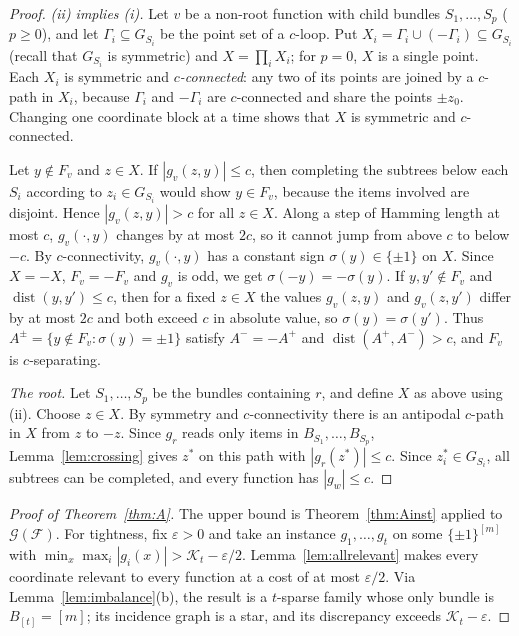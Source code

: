 \documentclass[11pt,letterpaper]{article}
\theoremstyle{definition}
\newcommand{\cF}{\mathcal{F}}
\newcommand{\cG}{\mathcal{G}}
\newcommand{\cube}[1]{\{\pm1\}^{#1}}
\DeclareMathOperator{\dist}{dist}
\begin{document}
\begin{proof}
\smallskip\noindent\emph{(ii) implies (i).}
Let $v$ be a non-root function with child bundles $S_1,\dots,S_p$ ($p\ge0$), and let
$\Gamma_i\subseteq G_{S_i}$ be the point set of a $c$-loop. Put $X_i=\Gamma_i\cup(-\Gamma_i)\subseteq
G_{S_i}$ (recall that $G_{S_i}$ is symmetric) and $X=\prod_iX_i$; for $p=0$, $X$ is a single
point. Each $X_i$ is symmetric and \emph{$c$-connected}: any two of its points are joined by a
$c$-path in $X_i$, because $\Gamma_i$ and $-\Gamma_i$ are $c$-connected and share the points $\pm
z_0$. Changing one coordinate block at a time shows that $X$ is symmetric and $c$-connected.

Let $y\notin F_v$ and $z\in X$. If $|g_v(z,y)|\le c$, then completing the subtrees below each
$S_i$ according to $z_i\in G_{S_i}$ would show $y\in F_v$, because the items involved are
disjoint. Hence $|g_v(z,y)|>c$ for all $z\in X$. Along a step of Hamming length at most $c$,
$g_v(\cdot,y)$ changes by at most $2c$, so it cannot jump from above $c$ to below $-c$. By
$c$-connectivity, $g_v(\cdot,y)$ has a constant sign $\sigma(y)\in\{\pm1\}$ on $X$. Since $X=-X$,
$F_v=-F_v$ and $g_v$ is odd, we get $\sigma(-y)=-\sigma(y)$. If $y,y'\notin F_v$ and
$\dist(y,y')\le c$, then for a fixed $z\in X$ the values $g_v(z,y)$ and $g_v(z,y')$ differ by at
most $2c$ and both exceed $c$ in absolute value, so $\sigma(y)=\sigma(y')$. Thus $A^\pm=\{y\notin
F_v:\sigma(y)=\pm1\}$ satisfy $A^-=-A^+$ and $\dist(A^+,A^-)>c$, and $F_v$ is $c$-separating.

\smallskip\noindent\emph{The root.}
Let $S_1,\dots,S_p$ be the bundles containing $r$, and define $X$ as above using (ii). Choose
$z\in X$. By symmetry and $c$-connectivity there is an antipodal $c$-path in $X$ from $z$ to $-z$.
Since $g_r$ reads only items in $B_{S_1},\dots,B_{S_p}$, Lemma~\ref{lem:crossing} gives $z^*$ on
this path with $|g_r(z^*)|\le c$. Since $z^*_i\in G_{S_i}$, all subtrees can be completed, and
every function has $|g_w|\le c$.
\end{proof}

\begin{proof}[Proof of Theorem~\ref{thm:A}]
The upper bound is Theorem~\ref{thm:Ainst} applied to $\cG(\cF)$. For tightness, fix $\varepsilon>0$
and take an instance $g_1,\dots,g_t$ on some $\cube{[m]}$ with $\min_x\max_i|g_i(x)|>\mathcal{K}_t-\varepsilon/2$.
Lemma~\ref{lem:allrelevant} makes every coordinate relevant to every function at a cost of at
most $\varepsilon/2$. Via Lemma~\ref{lem:imbalance}(b), the result is a $t$-sparse family whose
only bundle is $B_{[t]}=[m]$; its incidence graph is a star, and its discrepancy exceeds
$\mathcal{K}_t-\varepsilon$.
\end{proof}
\end{document}
